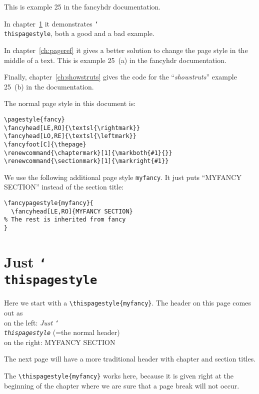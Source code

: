 \documentclass[openany]{book}
\renewcommand{\chaptermark}[1]{\markboth{#1}{}}
\renewcommand{\sectionmark}[1]{\markright{#1}}
\newcommand{\cs}[1]{\texttt{\char`\\#1}}
\begin{document}
\tableofcontents
\newpage
\thispagestyle{plain}
\noindent
\begin{boxedminipage}{\textwidth}
This is example 25 in the fancyhdr documentation.

In chapter~\ref{ch:just-thispagestyle} it demonstrates \cs{thispagestyle}, both a good and a bad example.

In chapter~\ref{ch:pageref} it gives a better solution to change the page style in the middle of a text. This is example 25~(a) in the \textsf{fancyhdr} documentation.

Finally, chapter~\ref{ch:showstruts} gives the code for the ``\emph{showstruts}'' example 25~(b) in the documentation.

The normal page style in this document is:
\begin{verbatim}
\pagestyle{fancy}
\fancyhead[LE,RO]{\textsl{\rightmark}}
\fancyhead[LO,RE]{\textsl{\leftmark}}
\fancyfoot[C]{\thepage}
\renewcommand{\chaptermark}[1]{\markboth{#1}{}}
\renewcommand{\sectionmark}[1]{\markright{#1}}
\end{verbatim}
We use the following additional page style \texttt{myfancy}. It just puts ``MYFANCY SECTION'' instead of the section title:
\begin{verbatim}
\fancypagestyle{myfancy}{
  \fancyhead[LE,RO]{MYFANCY SECTION}
% The rest is inherited from fancy
}
\end{verbatim}

\end{boxedminipage}

\chapter{Just \cs{thispagestyle}}
\label{ch:just-thispagestyle}

\thispagestyle{myfancy}

\begin{boxedminipage}{\textwidth}
Here we start with a \verb|\thispagestyle{myfancy}|. The header on this page comes out as\\
on the left: \textsl{Just \cs{thispagestyle}} (=the normal header)\\
on the right: MYFANCY SECTION

The next page will have a more traditional header with chapter and section titles.

The  \verb|\thispagestyle{myfancy}| works here, because it is given right at the beginning of the chapter where we are sure that a page break will not occur.
\end{boxedminipage}
\end{document}
